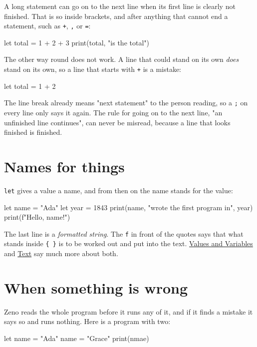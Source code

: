 A long statement can go on to the next line when its first line is
clearly not finished. That is so inside brackets, and after anything
that cannot end a statement, such as \verb|+|, \verb|,| or \verb|=|:

\begin{zeno}
let total = 1 +
    2 +
    3
print(total,
      "is the total")
\end{zeno}

The other way round does not work. A line that could stand on its own
\emph{does} stand on its own, so a line that starts with \verb|+| is a
mistake:

\begin{zeno}[fails=yes]
let total = 1
    + 2
\end{zeno}

\begin{why}
The line break already means "next statement" to the person reading,
so a \verb|;| on every line only says it again. The rule for going on
to the next line, "an unfinished line continues", can never be misread,
because a line that looks finished is finished.
\end{why}

\section{Names for things}

\verb|let| gives a value a name, and from then on the name stands for
the value:

\begin{zeno}
let name = "Ada"
let year = 1843
print(name, "wrote the first program in", year)
print(f"Hello, {name}!")
\end{zeno}

The last line is a \emph{formatted string}. The \verb|f| in front of
the quotes says that what stands inside \verb|{ }| is to be worked out
and put into the text. \hyperref[ch-values]{Values and Variables} and
\hyperref[ch-text]{Text} say much more about both.

\section{When something is wrong}

Zeno reads the whole program before it runs any of it, and if it finds
a mistake it says so and runs nothing. Here is a program with two:

\begin{zeno}[fails=yes]
let name = "Ada"
name = "Grace"
print(nmae)
\end{zeno}

